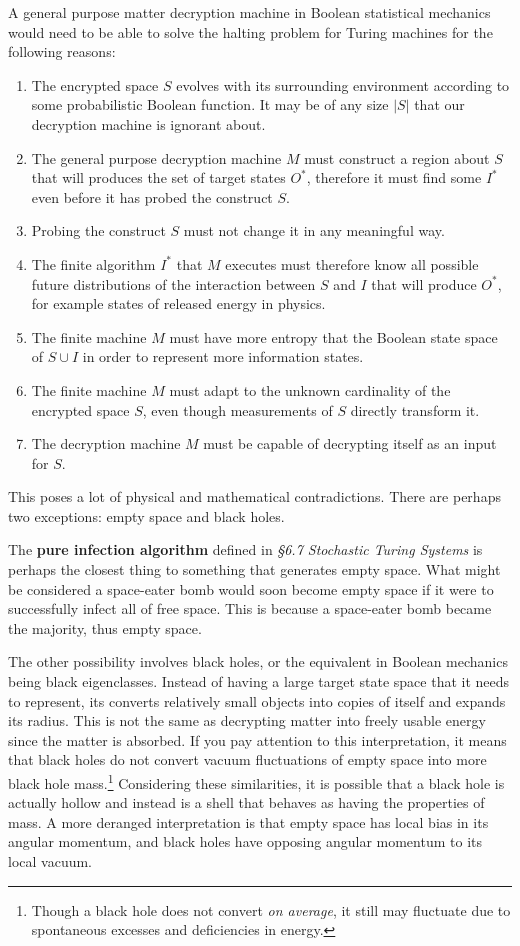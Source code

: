 \documentclass[10pt, a5paper, twoside, openright]{memoir}
\begin{document}
A general purpose matter decryption machine in Boolean statistical mechanics would need to be able to solve the halting problem for Turing machines for the following reasons:
\begin{enumerate}
\item The encrypted space $S$ evolves with its surrounding environment according to some probabilistic Boolean function. It may be of any size $|S|$ that our decryption machine is ignorant about.
\item The general purpose decryption machine $M$ must construct a region about $S$ that will produces the set of target states $O^*$, therefore it must find some $I^*$ even before it has probed the construct $S$.
\item Probing the construct $S$ must not change it in any meaningful way.
\item The finite algorithm $I^*$ that $M$ executes must therefore know all possible future distributions of the interaction between $S$ and $I$ that will produce $O^*$, for example states of released energy in physics.
\item The finite machine $M$ must have more entropy that the Boolean state space of $S \cup I$ in order to represent more information states.
\item The finite machine $M$ must adapt to the unknown cardinality of the encrypted space $S$, even though measurements of $S$ directly transform it.
\item The decryption machine $M$ must be capable of decrypting itself as an input for $S$.
\end{enumerate}
This poses a lot of physical and mathematical contradictions. There are perhaps two exceptions: empty space and black holes.

The \textbf{pure infection algorithm} defined in \textit{\S 6.7 Stochastic Turing Systems} is perhaps the closest thing to something that generates empty space. What might be considered a space-eater bomb would soon become empty space if it were to successfully infect all of free space. This is because a space-eater bomb became the majority, thus empty space.

The other possibility involves black holes, or the equivalent in Boolean mechanics being black eigenclasses. Instead of having a large target state space that it needs to represent, its converts relatively small objects into copies of itself and expands its radius. This is not the same as decrypting matter into freely usable energy since the matter is absorbed. If you pay attention to this interpretation, it means that black holes do not convert vacuum fluctuations of empty space into more black hole mass.\footnote{Though a black hole does not convert \textit{on average}, it still may fluctuate due to spontaneous excesses and deficiencies in energy.} Considering these similarities, it is possible that a black hole is actually hollow and instead is a shell that behaves as having the properties of mass. A more deranged interpretation is that empty space has local bias in its angular momentum, and black holes have opposing angular momentum to its local vacuum. 
\end{document}
